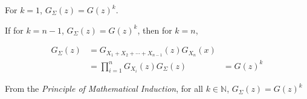 For $k = 1$, $G_\Sigma(z) = G(z)^k$.

If for $k = n-1$, $G_\Sigma(z) = G(z)^k$, then for $k = n$, 

\begin{align*}
    G_\Sigma(z) &= G_{X_1 + X_2 + \cdots + X_{n-1}}(z)G_{X_n}(x) \\ 
    &= \prod_{i=1}^{n} G_{X_i}(z)
    G_\Sigma(z) &= G(z)^k
\end{align*}

From the \textit{Principle of Mathematical Induction}, for all $k \in \mathbb{N}$, $G_\Sigma(z) = G(z)^k$